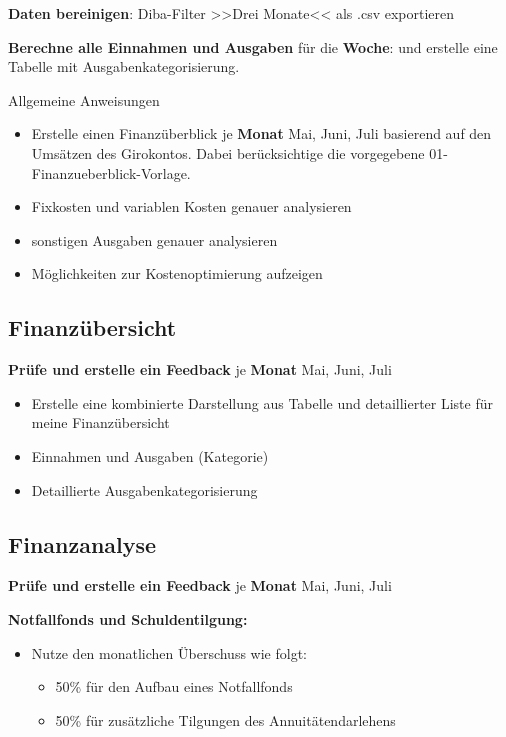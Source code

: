 \documentclass{vorlage-design-main}
\begin{document}
\textbf{Daten bereinigen}: Diba-Filter >>Drei Monate<< als .csv
exportieren

\textbf{Berechne alle Einnahmen und Ausgaben} für die \textbf{Woche}:
und erstelle eine Tabelle mit Ausgabenkategorisierung.

Allgemeine Anweisungen

\begin{itemize}

\item
  Erstelle einen Finanzüberblick je \textbf{Monat} Mai, Juni, Juli
  basierend auf den Umsätzen des Girokontos. Dabei berücksichtige die
  vorgegebene 01-Finanzueberblick-Vorlage.
\item
  Fixkosten und variablen Kosten genauer analysieren
\item
  sonstigen Ausgaben genauer analysieren
\item
  Möglichkeiten zur Kostenoptimierung aufzeigen
\end{itemize}

\subsection{Finanzübersicht}\label{finanzuebersicht}

\textbf{Prüfe und erstelle ein Feedback} je \textbf{Monat} Mai, Juni,
Juli

\begin{itemize}

\item
  Erstelle eine kombinierte Darstellung aus Tabelle und detaillierter
  Liste für meine Finanzübersicht
\item
  Einnahmen und Ausgaben (Kategorie)
\item
  Detaillierte Ausgabenkategorisierung
\end{itemize}

\subsection{Finanzanalyse}\label{finanzanalyse}

\textbf{Prüfe und erstelle ein Feedback} je \textbf{Monat} Mai, Juni,
Juli

\textbf{Notfallfonds und Schuldentilgung:}

\begin{itemize}

\item
  Nutze den monatlichen Überschuss wie folgt:

  \begin{itemize}
  
  \item
    50\% für den Aufbau eines Notfallfonds
  \item
    50\% für zusätzliche Tilgungen des Annuitätendarlehens
  \end{itemize}
\end{itemize}
\end{document}
